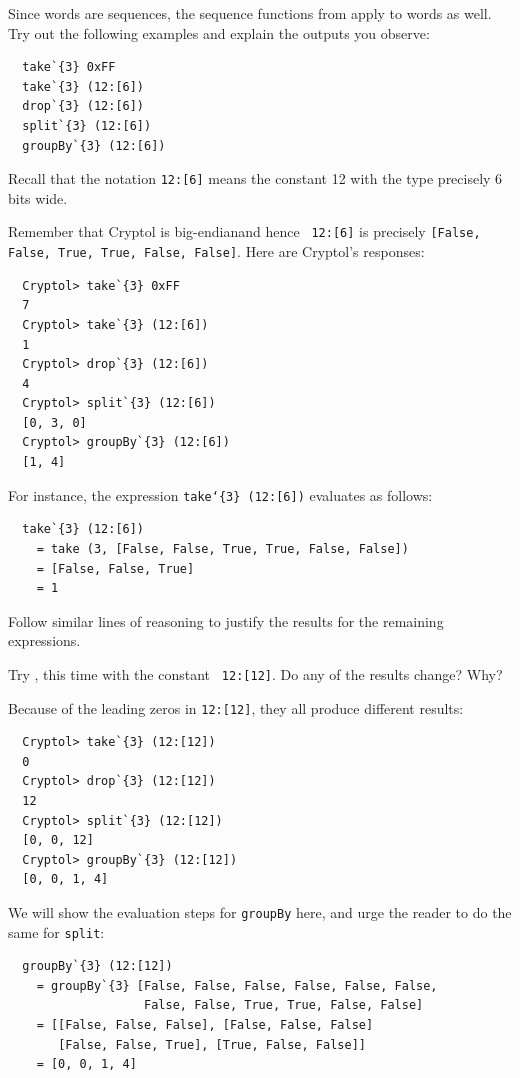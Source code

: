\begin{Exercise}\label{ex:words:4}
Since words are sequences, the sequence functions from
 apply to words as well.
Try out the following examples and explain the outputs you
observe:\indTake\indDrop\indSplit\indGroup
\begin{Verbatim}
  take`{3} 0xFF
  take`{3} (12:[6])
  drop`{3} (12:[6])
  split`{3} (12:[6])
  groupBy`{3} (12:[6])
\end{Verbatim}
\end{Exercise}
\noindent Recall that the notation {\tt 12:[6]} means the constant 12
with the type precisely 6 bits wide.
\begin{Answer}
  Remember that Cryptol is big-endian\indEndianness and hence {\tt
    12:[6]} is precisely {\tt [False, False, True, True, False,
    False]}.  Here are Cryptol's responses:\indTake
\begin{Verbatim}
  Cryptol> take`{3} 0xFF
  7
  Cryptol> take`{3} (12:[6])
  1
  Cryptol> drop`{3} (12:[6])
  4
  Cryptol> split`{3} (12:[6])
  [0, 3, 0]
  Cryptol> groupBy`{3} (12:[6])
  [1, 4]
\end{Verbatim}
For instance, the expression {\tt take`\{3\} (12:[6])} evaluates as follows:
\begin{Verbatim}
  take`{3} (12:[6])
    = take (3, [False, False, True, True, False, False])
    = [False, False, True]
    = 1
\end{Verbatim}
Follow similar lines of reasoning to justify the results for the
remaining expressions.
\end{Answer}
\begin{Exercise}\label{ex:words:5}
  Try , this time with the constant {\tt
    12:[12]}. Do any of the results change? Why?
\end{Exercise}
\begin{Answer}
  Because of the leading zeros in {\tt 12:[12]}, they all produce
  different results:\indTake\indDrop\indSplit\indGroup
\begin{Verbatim}
  Cryptol> take`{3} (12:[12])
  0
  Cryptol> drop`{3} (12:[12])
  12
  Cryptol> split`{3} (12:[12])
  [0, 0, 12]
  Cryptol> groupBy`{3} (12:[12])
  [0, 0, 1, 4]
\end{Verbatim}
We will show the evaluation steps for {\tt groupBy} here, and urge the
reader to do the same for {\tt split}:
\begin{Verbatim}
  groupBy`{3} (12:[12])
    = groupBy`{3} [False, False, False, False, False, False,
                   False, False, True, True, False, False]
    = [[False, False, False], [False, False, False]
       [False, False, True], [True, False, False]]
    = [0, 0, 1, 4]
\end{Verbatim}
\end{Answer}

